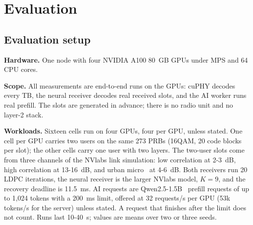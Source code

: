 \documentclass[acmsmall,screen,review,anonymous]{acmart}
\begin{document}
\section{Evaluation}

\subsection{Evaluation setup}

\noindent\textbf{Hardware.} One node with four NVIDIA A100 80~GB GPUs under MPS and 64 CPU cores.

\noindent\textbf{Scope.} All measurements are end-to-end runs on the GPUs: cuPHY decodes every TB, the
neural receiver decodes real received slots, and the AI worker runs real prefill. The slots are generated in
advance; there is no radio unit and no layer-2 stack.

\noindent\textbf{Workloads.} Sixteen cells run on four GPUs, four per GPU, unless stated. One cell per GPU
carries two users on the same 273 PRBs (16QAM, 20 code blocks per slot); the other cells carry one user
with two layers. The two-user slots come from three channels of the NVlabs link simulation: low
correlation at 2-3~dB, high correlation at 13-16~dB, and urban micro~\cite{tr38901} at 4-6~dB. Both
receivers run 20 LDPC iterations, the neural receiver is the larger NVlabs model, $K=9$, and the recovery
deadline is 11.5~ms. AI requests are Qwen2.5-1.5B~\cite{qwen25} prefill requests of up to 1,024 tokens with a
200~ms limit, offered at 32 requests/s per GPU (53k tokens/s for the server) unless stated. A request that
finishes after the limit does not count. Runs last 10-40~s; values are means over two or three seeds.
\end{document}
